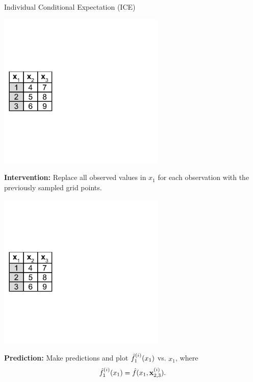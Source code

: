 \documentclass[11pt,compress,t,notes=noshow, xcolor=table]{beamer}
\begin{document}
\begin{vbframe}{Individual Conditional Expectation (ICE)}
\begin{center}
\includegraphics[page=2, width=0.6\textwidth]{figure_man/ice_pd_plot_demo}
\end{center}

\textbf{Intervention:} Replace all observed values in $x_1$ for each observation with the previously sampled grid points.

\framebreak

\begin{center}
\includegraphics[page=3, width=0.6\textwidth]{figure_man/ice_pd_plot_demo}
\end{center}
\vspace{-0.5cm}
\textbf{Prediction:} Make predictions and plot $\fh_{1}^{(i)}(x_1)$ vs. $x_1$, where $$\fh_{1}^{(i)}(x_1) = \fh(x_1, \xi_{2, 3}).$$


\end{vbframe}
\end{document}
